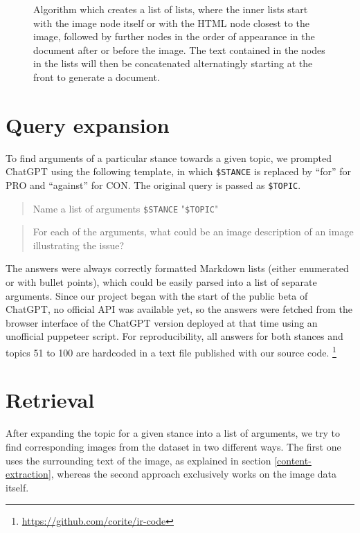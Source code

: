 \documentclass[
]{ceurart}
\begin{document}
\begin{figure}[htbp]
\begin{minipage}[b]{.41\textwidth}
\end{minipage}
\vspace{.5em}
\caption{Algorithm which creates a list of lists, where the inner lists start with the image node itself or with the HTML node closest to the image, followed by further nodes in the order of appearance in the document after or before the image. The text contained in the nodes in the lists will then be concatenated alternatingly starting at the front to generate a document.}
\end{figure}

\section{Query expansion}

To find arguments of a particular stance towards a given topic, we prompted ChatGPT using the following template, in which \texttt{\$STANCE} is replaced by \enquote{for} for PRO and \enquote{against} for CON. The original query is passed as \texttt{\$TOPIC}.

\begin{quote}
	Name a list of arguments \texttt{\$STANCE} "\texttt{\$TOPIC}"
\end{quote}
\begin{quote}
    For each of the arguments, what could be an image description of an image illustrating the issue?
\end{quote}

The answers were always correctly formatted Markdown lists (either enumerated or with bullet points), which could be easily parsed into a list of separate arguments. Since our project began with the start of the public beta of ChatGPT, no official API was available yet, so the answers were fetched from the browser interface of the ChatGPT version deployed at that time using an unofficial puppeteer script. For reproducibility, all answers for both stances and topics 51 to 100 are hardcoded in a text file published with our source code. \footnote{\url{https://github.com/corite/ir-code}}

\section{Retrieval}

After expanding the topic for a given stance into a list of arguments, we try to find corresponding images from the dataset in two different ways. The first one uses the surrounding text of the image, as explained in section \ref{content-extraction}, whereas the second approach exclusively works on the image data itself.
\end{document}
